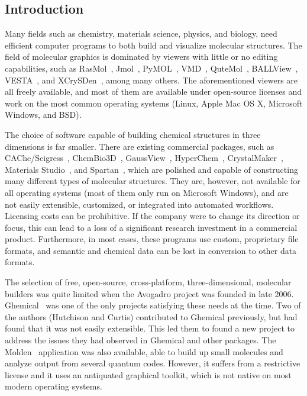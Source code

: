 \documentclass[10pt]{bmc_article}
\newenvironment{bmcformat}{\begin{raggedright}
  \baselineskip20pt\sloppy\setboolean{publ}{false}}{\end{raggedright}
  \baselineskip20pt\sloppy}
\begin{document}
\begin{bmcformat}
\begin{abstract}
\end{abstract}


\section*{Introduction}

Many fields such as chemistry, materials science, physics, and biology, need
efficient computer programs to both build and visualize molecular structures.
The field of molecular graphics is dominated by viewers with little or no
editing capabilities, such as RasMol~\cite{RasMol}, Jmol~\cite{JMol},
PyMOL~\cite{PyMOL}, VMD~\cite{VMD}, QuteMol~\cite{QuteMol},
BALLView~\cite{BALLView}, VESTA~\cite{vesta3}, and
XCrySDen~\cite{xcrysden1}\cite{xcrysden2}, among many others. The aforementioned
viewers are all freely available, and most of them are available under
open-source licenses and work on the most common operating systems (Linux, Apple
Mac OS X, Microsoft Windows, and BSD).

The choice of software capable of building chemical structures in
three dimensions is far smaller.
There are existing commercial packages, such as
CAChe/Scigress~\cite{CAChe}, ChemBio3D~\cite{Chem3D},
GaussView~\cite{GaussView}, HyperChem~\cite{HyperChem},
CrystalMaker~\cite{CrystalMaker},
Materials Studio~\cite{Accelrys}, and Spartan~\cite{Spartan},
which are polished and capable of
constructing many different types of molecular structures. They are,
however, not available for all operating systems (most of them only
run on Microsoft Windows), and are not easily extensible, customized,
or integrated into automated workflows. Licensing costs can be
prohibitive. If the company were to change its direction or focus, this
can lead to a loss of a significant research investment in a commercial
product. Furthermore, in most cases, these programs use custom,
proprietary file formats, and semantic and chemical data can be lost in
conversion to other data formats.

The selection of free, open-source, cross-platform, three-dimensional,
molecular builders was quite limited when the Avogadro project was founded in late 2006.
Ghemical~\cite{Ghemical} was one of the only projects satisfying these needs at
the time. Two of the authors (Hutchison and Curtis) contributed to Ghemical
previously, but had found that it was not easily extensible. This led them to
found a new project to address the issues they had observed in Ghemical
and other packages. The Molden~\cite{Molden} application was also available,
able to build up small molecules and analyze output from several quantum codes.
However, it suffers from a restrictive license and it uses an antiquated graphical
toolkit, which is not native on most modern operating systems.


\end{bmcformat}
\end{document}

